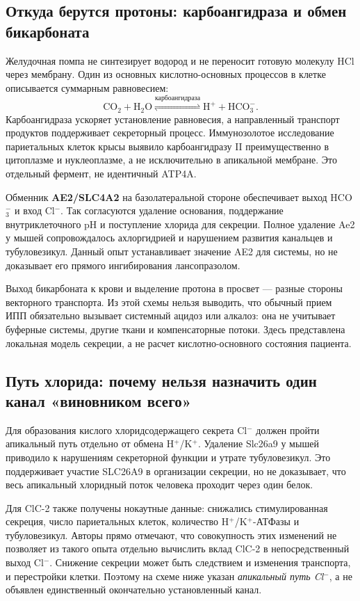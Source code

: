 \documentclass[11pt,a4paper,notitlepage]{report}
\newcommand{\src}[1]{\unskip\space\cite{#1}}
\begin{document}
\subsection{Откуда берутся протоны: карбоангидраза и обмен бикарбоната}
Желудочная помпа не синтезирует водород и не переносит готовую молекулу HCl через мембрану. Один из основных кислотно-основных процессов в клетке описывается суммарным равновесием:
\[
\mathrm{CO}_2+\mathrm{H_2O}
\overset{\text{карбоангидраза}}{\rightleftharpoons}
\mathrm{H}^{+}+\mathrm{HCO}_3^{-}.
\]
Карбоангидраза ускоряет установление равновесия, а направленный транспорт продуктов поддерживает секреторный процесс. Иммунозолотое исследование париетальных клеток крысы выявило карбоангидразу II преимущественно в цитоплазме и нуклеоплазме, а не исключительно в апикальной мембране. Это отдельный фермент, не идентичный ATP4A.\src{molca}

Обменник \textbf{AE2/SLC4A2} на базолатеральной стороне обеспечивает выход HCO$_3^{-}$ и вход Cl$^{-}$. Так согласуются удаление основания, поддержание внутриклеточного pH и поступление хлорида для секреции. Полное удаление Ae2 у мышей сопровождалось ахлоргидрией и нарушением развития канальцев и тубуловезикул. Данный опыт устанавливает значение AE2 для системы, но не доказывает его прямого ингибирования лансопразолом.\src{molae2}

Выход бикарбоната к крови и выделение протона в просвет --- разные стороны векторного транспорта. Из этой схемы нельзя выводить, что обычный прием ИПП обязательно вызывает системный ацидоз или алкалоз: она не учитывает буферные системы, другие ткани и компенсаторные потоки. Здесь представлена локальная модель секреции, а не расчет кислотно-основного состояния пациента.\src{molae2}

\subsection{Путь хлорида: почему нельзя назначить один канал «виновником всего»}
Для образования кислого хлоридсодержащего секрета Cl$^{-}$ должен пройти апикальный путь отдельно от обмена H$^+$/K$^+$. Удаление Slc26a9 у мышей приводило к нарушениям секреторной функции и утрате тубуловезикул. Это поддерживает участие SLC26A9 в организации секреции, но не доказывает, что весь апикальный хлоридный поток человека проходит через один белок.\src{molslc26}

Для ClC-2 также получены нокаутные данные: снижались стимулированная секреция, число париетальных клеток, количество H$^+$/K$^+$-АТФазы и тубуловезикул. Авторы прямо отмечают, что совокупность этих изменений не позволяет из такого опыта отдельно вычислить вклад ClC-2 в непосредственный выход Cl$^{-}$. Снижение секреции может быть следствием и изменения транспорта, и перестройки клетки. Поэтому на схеме ниже указан \emph{апикальный путь Cl$^{-}$}, а не объявлен единственный окончательно установленный канал.\src{molclc2}
\end{document}
